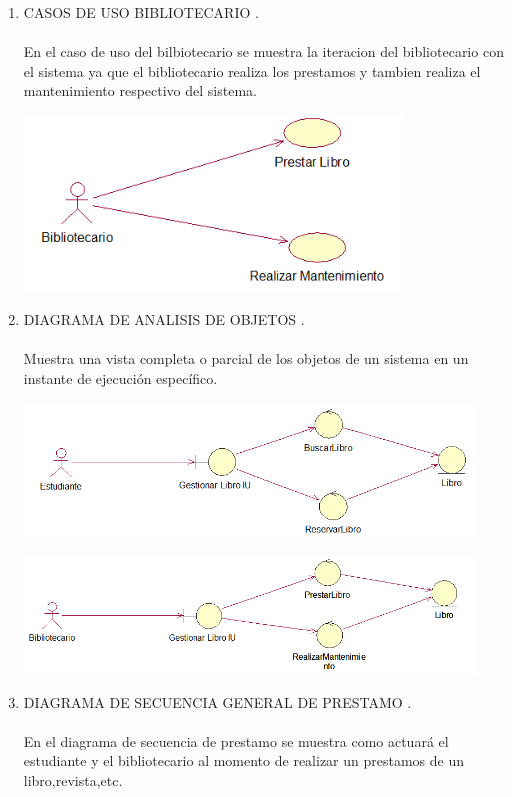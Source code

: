 \begin{enumerate}[1.]
	\item CASOS DE USO BIBLIOTECARIO .\\\\
		En el caso de uso del bilbiotecario se muestra la iteracion del bibliotecario con el sistema ya que el bibliotecario 	realiza los prestamos y tambien realiza el mantenimiento respectivo del sistema.
	\begin{center}
	\includegraphics[width=10cm]{./Imagenes/img2} 
	\end{center}
\newpage
   	 \item DIAGRAMA DE ANALISIS DE OBJETOS .\\\\
    Muestra una vista completa o parcial de los objetos de un sistema en un instante de ejecución específico.
	\begin{center}
	\includegraphics[width=12cm]{./Imagenes/img10} 
	\end{center}
	\begin{center}
	\includegraphics[width=12cm]{./Imagenes/img11} 
	\end{center}
\newpage
   	 \item DIAGRAMA DE SECUENCIA GENERAL DE PRESTAMO .\\\\
    En el diagrama de secuencia de prestamo se muestra como actuará el estudiante y el bibliotecario al momento de realizar un prestamos de un libro,revista,etc.\\

\end{enumerate}
